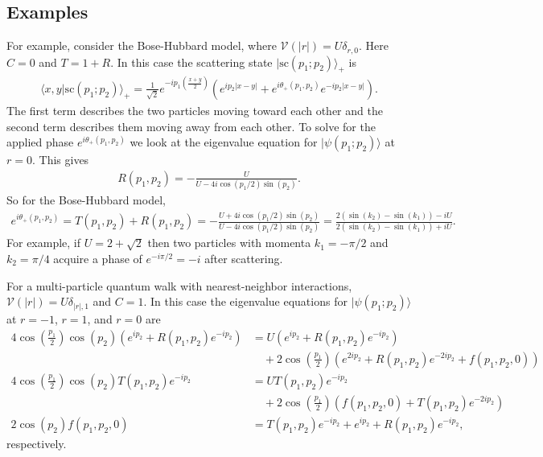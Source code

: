 \documentclass[../thesis-main/thesis-main]{subfiles}
\begin{document}
\subsection{Examples}


For example, consider the Bose-Hubbard model, where $\mathcal{V}(|r|) = U\delta_{r,0}$. Here $C=0$ and $T=1+R$.  In this case the scattering state $|\mathrm{sc}(p_1;p_2)\rangle_+$ is
\begin{align}
\langle x,y|\mathrm{sc}(p_1;p_2)\rangle_+=\frac{1}{\sqrt{2}}e^{-ip_1 \left(\frac{x+y}{2}\right)}\left(e^{ip_2 |x-y|}+e^{i\theta_+(p_1,p_2)}e^{-ip_2 |x-y|}\right).
\end{align}
The first term describes the two particles moving toward each other and the second term describes them moving away from each other. To solve for the applied phase $e^{i\theta_+(p_1,p_2)}$ we look at the eigenvalue equation for $|\psi(p_1;p_2)\rangle$ at $r=0$. This gives
\begin{align}
  R(p_1,p_2) =- \frac{U}{U - 4i\cos({p_1}/{2})\sin(p_2)}.
\end{align}
So for the Bose-Hubbard model,
\begin{align}
  e^{i \theta_{+} (p_1,p_2)} = T(p_1,p_2) + R(p_1,p_2) = - \frac{ U + 4 i \cos({p_1}/{2}) \sin(p_2)}{U - 4 i \cos({p_1}/{2}) \sin(p_2)} =  \frac{2 \left(\sin(k_2) - \sin(k_1)\right) - i U}{2 \left(\sin(k_2) - \sin(k_1)\right) + i U}.
\end{align}
For example, if $U = 2+\sqrt{2}$ then two particles with momenta $k_1 =-{ \pi}/{2}$ and $k_2={\pi}/{4}$ acquire a phase of $e^{-i\pi/2}= -i$ after scattering.

For a multi-particle quantum walk with nearest-neighbor interactions, $\mathcal{V}(|r|)=U\delta_{|r|,1}$ and $C=1$.  In this case the eigenvalue equations for $|\psi(p_1;p_2)\rangle$ at $r=-1$, $r=1$, and $r=0$ are
\begin{align*}
 4 \cos\left(\frac{p_1}{2}\right)  \cos(p_2) ( e^{i p_2} + R(p_1,p_2) e^{-i p_2} ) &= U ( e^{i p_2} + R(p_1,p_2) e^{-i p_2}) \\
& \quad + 2\cos\left(\frac{p_1}{2}\right) \left( e^{2i p_2} + R(p_1,p_2) e^{-2i p_2}+f(p_1,p_2,0)\right) \\
 4 \cos\left(\frac{p_1}{2}\right)  \cos(p_2) T(p_1,p_2) e^{-ip_2} & =UT(p_1,p_2)e^{-ip_2}\\
& \quad +2\cos \left(\frac{p_1}{2}\right)\left(f(p_1,p_2,0)+T(p_1,p_2)e^{-2ip_2}\right)\\
2 \cos(p_2) f(p_1,p_2,0) &=T(p_1,p_2)e^{-ip_2}+e^{ip_2}+R(p_1,p_2)e^{-ip_2},
\end{align*}
respectively.
\end{document}
